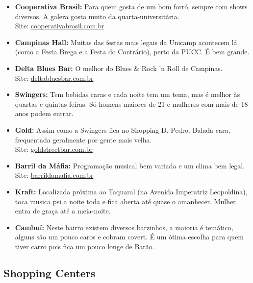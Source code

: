 \begin{itemize}
\item   \textbf{Cooperativa Brasil:} Para quem gosta de um bom forró, sempre com
        shows diversos. A galera gosta muito da quarta-universitária.
        \\Site: \url{cooperativabrasil.com.br}

\item   \textbf{Campinas Hall:} Muitas das festas mais legais da Unicamp
        acontecem lá (como a Festa Brega e a Festa do Contrário), perto da PUCC.
        É bem grande.

\item   \textbf{Delta Blues Bar:} O melhor do Blues \& Rock 'n Roll de
        Campinas.
        \\Site: \url{deltabluesbar.com.br}

\item   \textbf{Swingers:} Tem bebidas caras e cada noite tem um tema, mas
        é melhor às quartas e quintas-feiras. Só homens maiores de 21 e mulheres
        com mais de 18 anos podem entrar.

\item   \textbf{Gold:} Assim como a Swingers fica no Shopping D. Pedro. Balada
        cara, frequentada geralmente por gente mais velha.
        \\Site: \url{goldstreetbar.com.br}

\item   \textbf{Barril da Máfia:} Programação musical bem variada e um clima
        bem legal.
        \\Site: \url{barrildamafia.com.br}

\item   \textbf{Kraft:} Localizada próxima ao Taquaral (na Avenida Imperatriz
        Leopoldina), toca musica psi a noite toda e fica aberta até quase
        o amanhecer. Mulher entra de graça até a meia-noite.

\item   \textbf{Cambuí:} Neste bairro existem diversos barzinhos, a maioria
        é temático, alguns são um pouco caros e cobram covert. É um ótima escolha
        para quem tiver carro pois fica um pouco longe de Barão.

\end{itemize}

\subsection{Shopping Centers}

